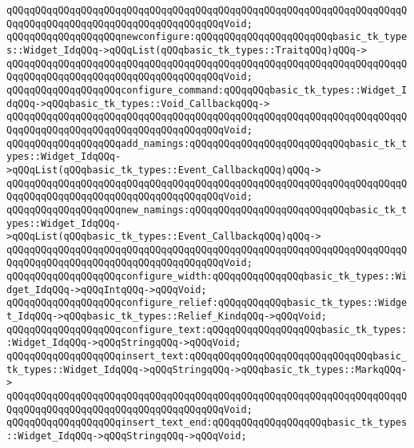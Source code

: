 \verb|qQQqqQQqqQQqqQQqqQQqqQQqqQQqqQQqqQQqqQQqqQQqqQQqqQQqqQQqqQQqqQQqqQQqqQQqqQQqqQQqqQQqqQQqqQQqqQQqqQQqqQQqqQQqVoid;|\newline
\verb|qQQqqQQqqQQqqQQqqQQqnewconfigure:qQQqqQQqqQQqqQQqqQQqqQQqbasic_tk_types::Widget_IdqQQq->qQQqList(qQQqbasic_tk_types::TraitqQQq)qQQq->|\newline
\verb|qQQqqQQqqQQqqQQqqQQqqQQqqQQqqQQqqQQqqQQqqQQqqQQqqQQqqQQqqQQqqQQqqQQqqQQqqQQqqQQqqQQqqQQqqQQqqQQqqQQqqQQqqQQqVoid;|\newline
\verb|qQQqqQQqqQQqqQQqqQQqconfigure_command:qQQqqQQqbasic_tk_types::Widget_IdqQQq->qQQqbasic_tk_types::Void_CallbackqQQq->|\newline
\verb|qQQqqQQqqQQqqQQqqQQqqQQqqQQqqQQqqQQqqQQqqQQqqQQqqQQqqQQqqQQqqQQqqQQqqQQqqQQqqQQqqQQqqQQqqQQqqQQqqQQqqQQqqQQqVoid;|\newline
\verb|qQQqqQQqqQQqqQQqqQQqadd_namings:qQQqqQQqqQQqqQQqqQQqqQQqqQQqbasic_tk_types::Widget_IdqQQq->qQQqList(qQQqbasic_tk_types::Event_CallbackqQQq)qQQq->|\newline
\verb|qQQqqQQqqQQqqQQqqQQqqQQqqQQqqQQqqQQqqQQqqQQqqQQqqQQqqQQqqQQqqQQqqQQqqQQqqQQqqQQqqQQqqQQqqQQqqQQqqQQqqQQqqQQqVoid;|\newline
\verb|qQQqqQQqqQQqqQQqqQQqnew_namings:qQQqqQQqqQQqqQQqqQQqqQQqqQQqbasic_tk_types::Widget_IdqQQq->qQQqList(qQQqbasic_tk_types::Event_CallbackqQQq)qQQq->|\newline
\verb|qQQqqQQqqQQqqQQqqQQqqQQqqQQqqQQqqQQqqQQqqQQqqQQqqQQqqQQqqQQqqQQqqQQqqQQqqQQqqQQqqQQqqQQqqQQqqQQqqQQqqQQqqQQqVoid;|\newline
\verb|qQQqqQQqqQQqqQQqqQQqconfigure_width:qQQqqQQqqQQqqQQqbasic_tk_types::Widget_IdqQQq->qQQqIntqQQq->qQQqVoid;|\newline
\verb|qQQqqQQqqQQqqQQqqQQqconfigure_relief:qQQqqQQqqQQqbasic_tk_types::Widget_IdqQQq->qQQqbasic_tk_types::Relief_KindqQQq->qQQqVoid;|\newline
\verb|qQQqqQQqqQQqqQQqqQQqconfigure_text:qQQqqQQqqQQqqQQqqQQqbasic_tk_types::Widget_IdqQQq->qQQqStringqQQq->qQQqVoid;|\newline
\newline
\verb|qQQqqQQqqQQqqQQqqQQqinsert_text:qQQqqQQqqQQqqQQqqQQqqQQqqQQqqQQqbasic_tk_types::Widget_IdqQQq->qQQqStringqQQq->qQQqbasic_tk_types::MarkqQQq->|\newline
\verb|qQQqqQQqqQQqqQQqqQQqqQQqqQQqqQQqqQQqqQQqqQQqqQQqqQQqqQQqqQQqqQQqqQQqqQQqqQQqqQQqqQQqqQQqqQQqqQQqqQQqqQQqqQQqVoid;|\newline
\verb|qQQqqQQqqQQqqQQqqQQqinsert_text_end:qQQqqQQqqQQqqQQqqQQqbasic_tk_types::Widget_IdqQQq->qQQqStringqQQq->qQQqVoid;|\newline
